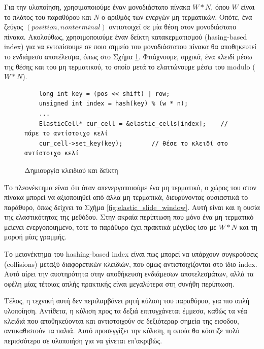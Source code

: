 Για την υλοποίηση, χρησιμοποιούμε έναν μονοδιάστατο πίνακα $W*N$, όπου $W$ είναι το πλάτος του παραθύρου και $N$ ο αριθμός των ενεργών μη τερματικών.
Οπότε, ένα ζεύγος $(position, non terminal)$ αντιστοιχεί σε μία θέση στον μονοδιάστατο πίνακα.
Ακολούθως, χρησιμοποιούμε έναν δείκτη κατακερματισμού (hasing-based index) για να εντοπίσουμε σε ποιο σημείο του μονοδιάστατου πίνακα θα αποθηκευτεί το ενδιάμεσο αποτέλεσμα, όπως στο Σχήμα \ref{fig:elastic_1}.
Φτιάχνουμε, αρχικά, ένα κλειδί μέσω της θέσης και του μη τερματικού, το οποίο μετά το ελαττώνουμε μέσω του modulo ($W*N$).

\begin{figure}[h]
\setlength\partopsep{-\topsep}%
\begin{verbatim}
    long int key = (pos << shift) | row;
    unsigned int index = hash(key) % (w * n);
    ...
    ElasticCell* cur_cell = &elastic_cells[index];    // πάρε το αντίστοιχο κελί
    cur_cell->set_key(key);        // θέσε το κλειδί στο αντίστοιχο κελί
\end{verbatim}
\caption{Δημιουργία κλειδιού και δείκτη}
\label{fig:elastic_1}
\end{figure}

Το πλεονέκτημα είναι ότι όταν απενεργοποιούμε ένα μη τερματικό, ο χώρος του στον πίνακα μπορεί να αξιοποιηθεί από άλλα μη τερματικά, διευρύνοντας ουσιαστικά το παράθυρο, όπως δείχνει το Σχήμα \ref{fig:elastic_slide_window}. 
Αυτή είναι και η ουσία της ελαστικότητας της μεθόδου. 
Στην ακραία περίπτωση που μόνο ένα μη τερματικό μείενει ενεργοποιημενο, τότε το παράθυρο έχει πρακτικά μέγεθος ίσο με $W*N$ και τη μορφή μίας γραμμής.

Το μειονέκτημα του hashing-based index είναι πως μπορεί να υπάρχουν συγκρούσεις (collisions) μεταξύ διαφορετικών κλειδιών, που όμως αντιστοιχίζονται στο ίδιο index.
Αυτό αίρει την αυστηρότητα στην αποθήκευση ενδιάμεσων αποτελεσμάτων, αλλά τα οφέλη μίας τέτοιας απλής πρακτικής είναι μεγαλύτερα στη συνήθη περίπτωση.

Τέλος, η τεχνική αυτή δεν περιλαμβάνει ρητή κύλιση του παραθύρου, για πιο απλή υλοποίηση.
Αντίθετα, η κύλιση προς τα δεξιά επιτυγχάνεται έμμεσα, καθώς τα νέα κλειδιά που αποθηκεύονται και αντιστοιχούν σε δεξιότεραρ σημεία της εισοδου, αντικαθιστούν τα παλιά.
Αυτό προσεγγίζει την κύλιση, η οποία θα κόστιζε πολύ περισσότερο σε υλοποιήση για να γίνεται επ'ακριβώς.

